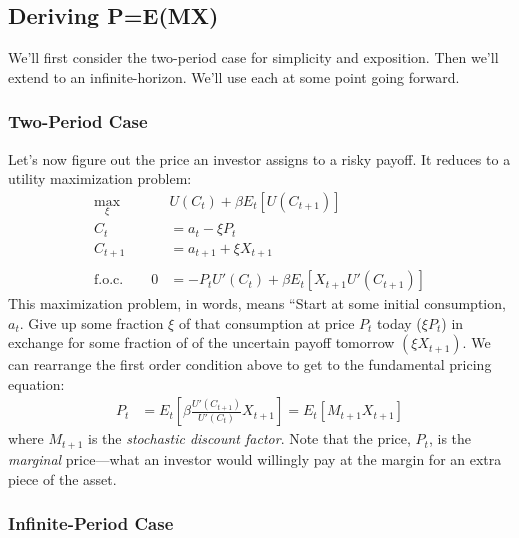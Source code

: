 \documentclass[a4paper,12pt]{scrartcl}
\begin{document}
\newpage
\subsection{Deriving P=E(MX)}

We'll first consider the two-period case for simplicity and
exposition. Then we'll extend to an infinite-horizon. We'll use
each at some point going forward.

\subsubsection{Two-Period Case}

Let's now figure out the price an investor assigns to a risky
payoff.  It reduces to a utility maximization problem:
\begin{align*}
    \max_{\xi} \quad &U(C_t) + \beta E_t\left[U(C_{t+1})\right] \\
    C_t &= a_t - \xi P_t  \\
    C_{t+1} &= a_{t+1} + \xi X_{t+1} \\\\
    \text{f.o.c.} \qquad
    0 &= -P_t U'(C_t) + \beta E_t\left[ X_{t+1} U'(C_{t+1})\right]
\end{align*}
This maximization problem, in words, means ``Start
at some initial consumption, $a_t$. Give up some
fraction $\xi$ of that consumption at price $P_t$ today
($\xi P_t$) in exchange for some fraction of of the
uncertain payoff tomorrow $(\xi X_{t+1})$. We can
rearrange the first order condition above to get to the
fundamental pricing equation:
\begin{align}
    P_t &= E_t\left[
	\beta\frac{U'(C_{t+1})}{U'(C_{t})} X_{t+1} \right]
    = E_t\left[ M_{t+1} X_{t+1} \right]
	\label{fullpemx}
\end{align}
where $M_{t+1}$ is the \emph{stochastic discount factor}.
Note that the price, $P_t$, is the \emph{marginal} price---what
an investor would willingly pay at the margin for
an extra piece of the asset.

\subsubsection{Infinite-Period Case}
\end{document}
